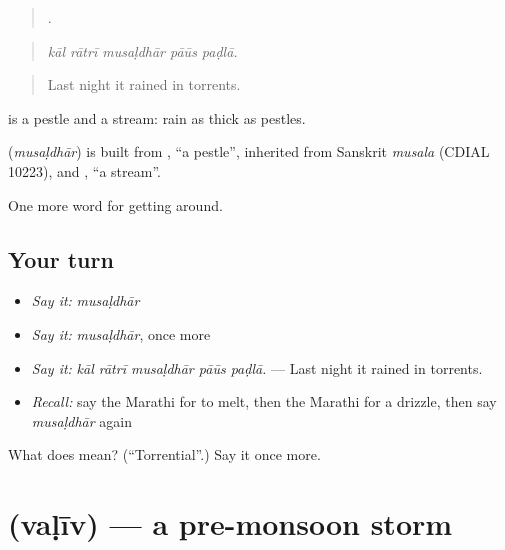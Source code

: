 \begin{quote}
    .
\end{quote}

\begin{quote}
\emph{kāl rātrī musaḷdhār pāūs paḍlā.}
\end{quote}

\begin{quote}
Last night it rained in torrents.
\end{quote}

 is a pestle and  a stream: rain as thick as pestles.

\begin{cousinweb}
\textbf{} (\emph{musaḷdhār}) is built from \textbf{}, \textquotedblleft{}a pestle\textquotedblright{}, inherited from Sanskrit \emph{musala} (CDIAL 10223), and \textbf{}, \textquotedblleft{}a stream\textquotedblright{}.
\end{cousinweb}

\begin{grammarlens}[title={What you've built}]
One more word for getting around.
\end{grammarlens}

\subsection*{Your turn}
\begin{itemize}
\raggedright
  \item \emph{Say it:} \emph{musaḷdhār}
  \item \emph{Say it:} \emph{musaḷdhār}, once more
  \item \emph{Say it:} \emph{kāl rātrī musaḷdhār pāūs paḍlā.} — Last night it rained in torrents.
  \item \emph{Recall:} say the Marathi for to melt, then the Marathi for a drizzle, then say \emph{musaḷdhār} again
\end{itemize}

\begin{tcolorbox}[breakable,colback=teal!4,colframe=teal!35!black,title={Before you move on}]
What does  mean? (\textquotedblleft{}Torrential\textquotedblright{}.) Say it once more.
\end{tcolorbox}
\section[\texorpdfstring{\mr{वळीव} (vaḷīv)}{वळीव (vaḷīv)}]{ (vaḷīv) — a pre-monsoon storm}

